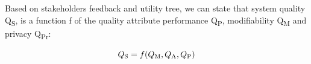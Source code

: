 \documentclass[conference]{IEEEtran}
\begin{document}

Based on stakeholders feedback and utility tree, we can state that system quality Q\textsubscript{S}, is a function f of the quality attribute performance Q\textsubscript{P}, modifiability Q\textsubscript{M} and privacy Q\textsubscript{Pr}:

\begin{equation}
    Q\textsubscript{S} = f(Q\textsubscript{M}, Q\textsubscript{A}, Q\textsubscript{P})
\end{equation}
\end{document}
